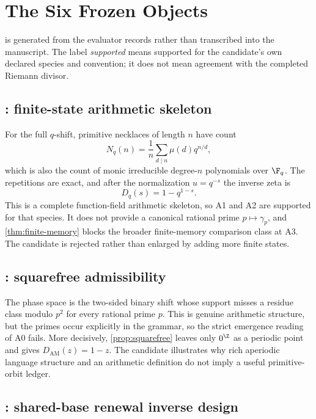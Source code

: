 \section{The Six Frozen Objects}
\label{sec:candidates}



 is generated from the evaluator records rather
than transcribed into the manuscript.  The label \emph{supported} means
supported for the candidate's own declared species and convention; it does
not mean agreement with the completed Riemann divisor.

\subsection{: finite-state arithmetic skeleton}

For the full \(q\)-shift, primitive necklaces of length \(n\) have count
\[
  N_q(n)=\frac{1}{n}\sum_{d\mid n}\mu(d)q^{n/d},
\]
which is also the count of monic irreducible degree-\(n\) polynomials over
\(\F_q\).  The repetitions are exact, and after the normalization
\(u=q^{-s}\) the inverse zeta is
\[
  D_q(s)=1-q^{1-s}.
\]
This is a complete function-field arithmetic skeleton, so A1 and A2 are
supported for that species.  It does not provide a canonical rational prime
\(p\mapsto\gamma_p\), and \cref{thm:finite-memory} blocks the broader
finite-memory comparison class at A3.  The candidate is rejected rather than
enlarged by adding more finite states.

\subsection{: squarefree admissibility}

The phase space is the two-sided binary shift whose support misses a residue
class modulo \(p^2\) for every rational prime \(p\).  This is genuine
arithmetic structure, but the primes occur explicitly in the grammar, so the
strict emergence reading of A0 fails.  More decisively,
\cref{prop:squarefree} leaves only \(0^\Z\) as a periodic point and gives
\(D_{\mathrm{AM}}(z)=1-z\).  The candidate illustrates why rich aperiodic
language structure and an arithmetic definition do not imply a useful
primitive-orbit ledger.

\subsection{: shared-base renewal inverse design}

